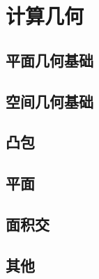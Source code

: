 \documentclass[12pt,a4paper,titlepage]{article}
\begin{document}
\section{\LARGE 计算几何}
	\subsection{平面几何基础}
    
    
    
    
    

	\subsection{空间几何基础}
    
    

	\subsection{凸包}
	
	
	
	
	

	\subsection{平面}
	
	
	
	
	

	\subsection{面积交}
	
	
	
	
	

	\subsection{其他}
    
\end{document}
